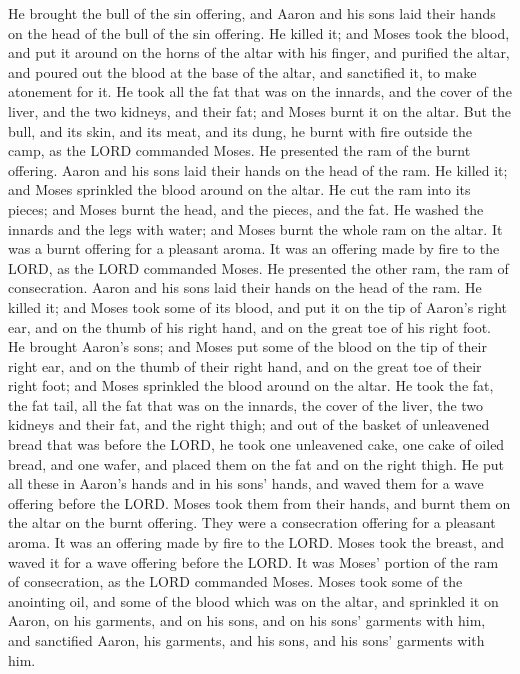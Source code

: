  He brought the bull of the sin offering, and Aaron and
his sons laid their hands on the head of the bull of the sin offering.
 He killed it; and Moses took the blood, and put it
around on the horns of the altar with his finger, and purified the
altar, and poured out the blood at the base of the altar, and sanctified
it, to make atonement for it.  He took all the fat that
was on the innards, and the cover of the liver, and the two kidneys, and
their fat; and Moses burnt it on the altar.  But the
bull, and its skin, and its meat, and its dung, he burnt with fire
outside the camp, as the LORD commanded Moses.  He
presented the ram of the burnt offering. Aaron and his sons laid their
hands on the head of the ram.  He killed it; and Moses
sprinkled the blood around on the altar.  He cut the ram
into its pieces; and Moses burnt the head, and the pieces, and the fat.
 He washed the innards and the legs with water; and Moses
burnt the whole ram on the altar. It was a burnt offering for a pleasant
aroma. It was an offering made by fire to the LORD, as the LORD
commanded Moses.  He presented the other ram, the ram of
consecration. Aaron and his sons laid their hands on the head of the
ram.  He killed it; and Moses took some of its blood, and
put it on the tip of Aaron's right ear, and on the thumb of his right
hand, and on the great toe of his right foot.  He brought
Aaron's sons; and Moses put some of the blood on the tip of their right
ear, and on the thumb of their right hand, and on the great toe of their
right foot; and Moses sprinkled the blood around on the altar.
 He took the fat, the fat tail, all the fat that was on
the innards, the cover of the liver, the two kidneys and their fat, and
the right thigh;  and out of the basket of unleavened
bread that was before the LORD, he took one unleavened cake, one cake of
oiled bread, and one wafer, and placed them on the fat and on the right
thigh.  He put all these in Aaron's hands and in his
sons' hands, and waved them for a wave offering before the LORD.
 Moses took them from their hands, and burnt them on the
altar on the burnt offering. They were a consecration offering for a
pleasant aroma. It was an offering made by fire to the LORD.
 Moses took the breast, and waved it for a wave offering
before the LORD. It was Moses' portion of the ram of consecration, as
the LORD commanded Moses.  Moses took some of the
anointing oil, and some of the blood which was on the altar, and
sprinkled it on Aaron, on his garments, and on his sons, and on his
sons' garments with him, and sanctified Aaron, his garments, and his
sons, and his sons' garments with him.

